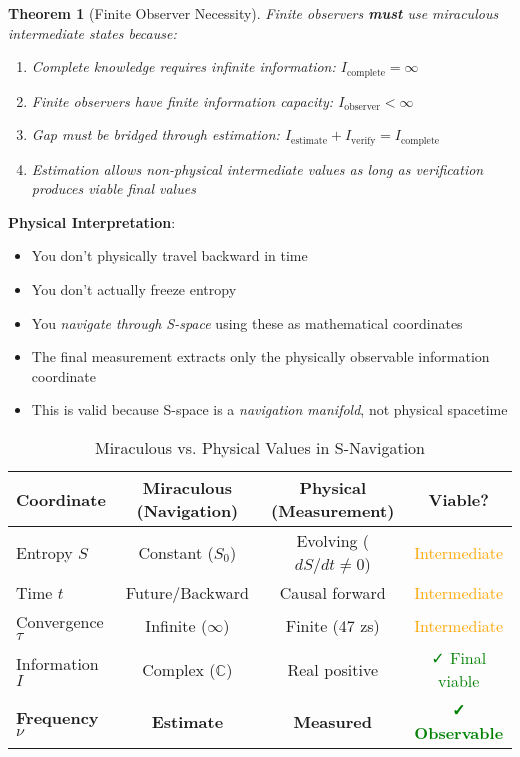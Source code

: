 \documentclass[12pt,a4paper]{article}
\newtheorem{theorem}{Theorem}[section]
\begin{document}
\begin{theorem}[Finite Observer Necessity]
Finite observers \textbf{must} use miraculous intermediate states because:
\begin{enumerate}
\item Complete knowledge requires infinite information: $I_{\text{complete}} = \infty$
\item Finite observers have finite information capacity: $I_{\text{observer}} < \infty$
\item Gap must be bridged through estimation: $I_{\text{estimate}} + I_{\text{verify}} = I_{\text{complete}}$
\item Estimation allows non-physical intermediate values as long as verification produces viable final values
\end{enumerate}
\end{theorem}

\textbf{Physical Interpretation}:
\begin{itemize}
\item You don't physically travel backward in time
\item You don't actually freeze entropy
\item You \textit{navigate through S-space} using these as mathematical coordinates
\item The final measurement extracts only the physically observable information coordinate
\item This is valid because S-space is a \textit{navigation manifold}, not physical spacetime
\end{itemize}

\begin{table}[H]
\centering
\caption{Miraculous vs. Physical Values in S-Navigation}
\begin{tabular}{lccc}
\toprule
Coordinate & Miraculous (Navigation) & Physical (Measurement) & Viable? \\
\midrule
Entropy $S$ & Constant ($S_0$) & Evolving ($dS/dt \neq 0$) & \textcolor{orange}{Intermediate} \\
Time $t$ & Future/Backward & Causal forward & \textcolor{orange}{Intermediate} \\
Convergence $\tau$ & Infinite ($\infty$) & Finite (47 zs) & \textcolor{orange}{Intermediate} \\
Information $I$ & Complex ($\mathbb{C}$) & Real positive & \textcolor{green}{✓ Final viable} \\
\midrule
\textbf{Frequency $\nu$} & \textbf{Estimate} & \textbf{Measured} & \textcolor{green}{\textbf{✓ Observable}} \\
\bottomrule
\end{tabular}
\end{table}
\end{document}
